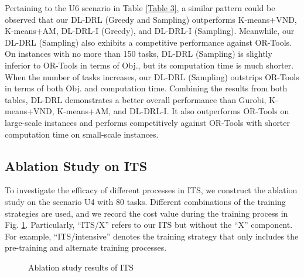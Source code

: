 \documentclass[lettersize,journal]{IEEEtran}
\begin{document}
	Pertaining to the U6 scenario in Table \ref{Table 3}, a similar pattern could be observed that our DL-DRL (Greedy and Sampling) outperforms K-means+VND, K-means+AM, DL-DRL-I (Greedy), and DL-DRL-I (Sampling). Meanwhile, our DL-DRL (Sampling) also exhibits a competitive performance against OR-Tools. On instances with no more than 150 tasks, DL-DRL (Sampling) is slightly inferior to OR-Tools in terms of Obj., but its computation time is much shorter. When the number of tasks increases, our DL-DRL (Sampling) outstrips OR-Tools in terms of both Obj. and computation time. Combining the results from both tables, DL-DRL demonstrates a better overall performance than Gurobi, K-means+VND, K-means+AM, and DL-DRL-I. It also outperforms OR-Tools on large-scale instances and performs competitively against OR-Tools with shorter computation time on small-scale instances.
	
	
	\subsection{Ablation Study on ITS}
	
	To investigate the efficacy of different processes in ITS, we construct the ablation study on the scenario U4 with 80 tasks. Different combinations of the training strategies are used, and we record the cost value during the training process in Fig. \ref{Fig. 5}. Particularly, “ITS/X” refers to our ITS but without the “X” component. For example, “ITS/intensive” denotes the training strategy that only includes the pre-training and alternate training processes.
	
	\begin{figure}[htb]
		\caption{Ablation study results of ITS}
		\label{Fig. 5}
	\end{figure}
	
\end{document}
